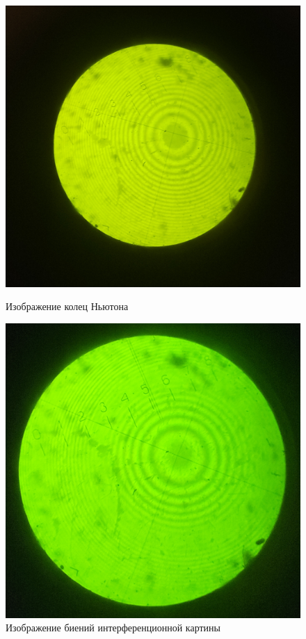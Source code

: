\documentclass[a4paper, 12pt]{article}
\begin{document}
\begin{figure}[H]
    \begin{minipage}{0.49\textwidth} %
        \centering
        \includegraphics[width=\linewidth]{newton_rings_image.jpg} %
        \caption{Изображение колец Ньютона}
    \end{minipage}
    \hfill
    \begin{minipage}{0.46\textwidth}
        \centering
        \includegraphics[width=\linewidth]{beats.jpg} %
        \caption{Изображение биений интерференционной картины}
    \end{minipage}
    
    \label{fig:two_images}
\end{figure}
\end{document}
